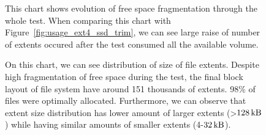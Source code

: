 \documentclass[
  color, %
  table, %
  lof,   %
  lot,   %
]{fithesis3}
\begin{document}
\begin{figure}[h]
    \centering
    \caption[Evolution of free space fragmentation of ext4 during testing on SSD with regular trimming]{This chart shows evolution of free space fragmentation through the whole test. When comparing this chart with Figure~\ref{fig:usage_ext4_ssd_trim}, we can see large raise of number of extents occured after the test consumed all the available volume.}
    \label{fig:free_ext4_ssd}
\end{figure}

\begin{figure}[h]
    \centering
    \caption[Size distribution of file extents of ext4 during testing on SSD with regular trimming]{On this chart, we can see distribution of size of file extents. Despite high fragmentation of free space during the test, the final block layout of file system have around 151 thousands of extents. 98\% of files were optimally allocated. Furthermore, we can observe that extent size distribution has lower amount of larger extents (>$\SI{128}{\kilo\byte}$) while having similar amounts of smaller extents (4-$\SI{32}{\kilo\byte}$).}
    \label{fig:used_ext4_ssd}
\end{figure}
\end{document}
